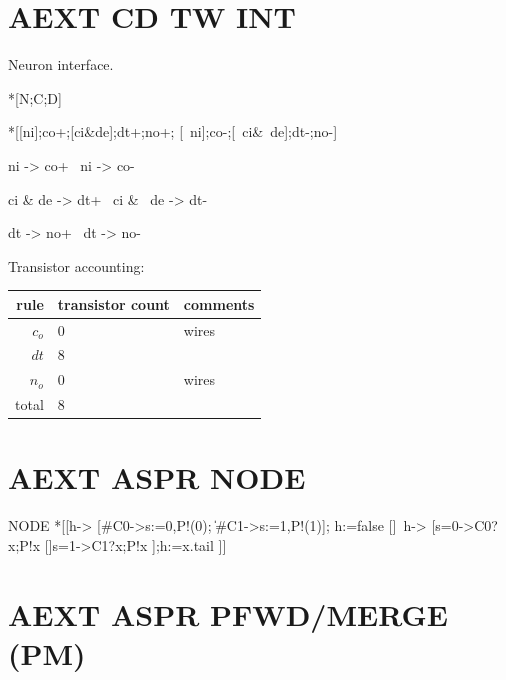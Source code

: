 \documentclass{article}
\begin{document}
\section{AEXT CD TW INT \label{sec:AEXT_CD_TW_INT}}

Neuron interface.

\begin{csp}
*[N;C;D]
\end{csp}

\begin{hse}
*[[ni];co+;[ci&de];dt+;no+;
  [~ni];co-;[~ci&~de];dt-;no-]
\end{hse}

\begin{prs2}
ni -> co+
~ni -> co-

ci & de -> dt+
~ci & ~de -> dt-

dt -> no+
~dt -> no-
\end{prs2}

\noindent Transistor accounting:

\begin{center}
    \begin{tabular}{|r|l|l|}
    \hline
    rule & transistor count & comments \\ \hline
    $c_o$ & 0 & wires \\ \hline
    $dt$ & 8 & \\ \hline
    $n_o$ & 0 & wires \\ \hline
    \hline total & 8 & \\ \hline
    \end{tabular}
\end{center}

\section{AEXT ASPR NODE}

\begin{csp}
NODE\equiv
*[[h->
    [#{C0}->s:=0,P!(0);
    \|#{C1}->s:=1,P!(1)];
    h:=false
  []~h->
    [s=0->C0?x;P!x
    []s=1->C1?x;P!x
    ];h:=x.tail
 ]]
\end{csp}

\section{AEXT ASPR PFWD/MERGE (PM)}
\end{document}
